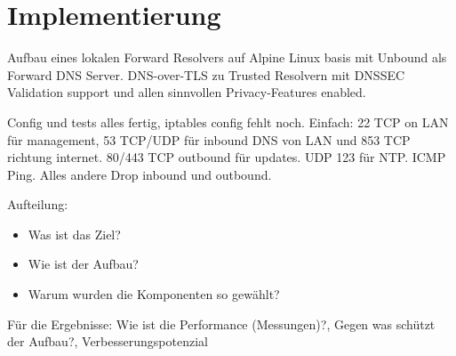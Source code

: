 \chapter{Implementierung}
\label{chap:implementation}


\begin{draft}
Aufbau eines lokalen Forward Resolvers auf Alpine Linux basis mit Unbound als Forward DNS Server.
DNS-over-TLS zu Trusted Resolvern mit DNSSEC Validation support und allen sinnvollen Privacy-Features enabled. 

Config und tests alles fertig, iptables config fehlt noch. Einfach: 22 TCP on LAN für management, 53 TCP/UDP für inbound DNS von LAN und 853 TCP richtung internet. 80/443 TCP outbound für updates. UDP 123 für NTP. ICMP Ping. Alles andere Drop inbound und outbound.

Aufteilung:
\begin{itemize}
    \item Was ist das Ziel?
    \item Wie ist der Aufbau?
    \item Warum wurden die Komponenten so gewählt?
\end{itemize}

Für die Ergebnisse: Wie ist die Performance (Messungen)?, Gegen was schützt der Aufbau?, Verbesserungspotenzial

\end{draft}
